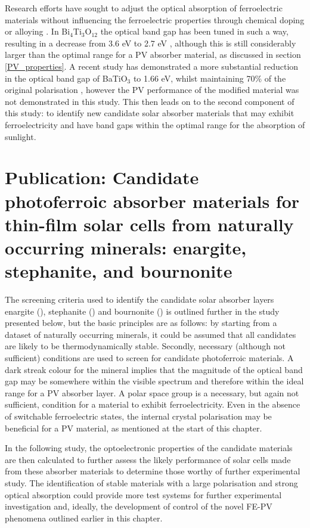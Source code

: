 \documentclass[11pt, twoside]{report}
\begin{document}
Research efforts have sought to adjust the optical absorption of ferroelectric materials without influencing the ferroelectric properties through chemical doping or alloying \cite{FE_PV_rev1}. In Bi$_4$Ti$_3$O$_{12}$ the optical band gap has been tuned in such a way, resulting in a decrease from 3.6 eV to 2.7 eV \cite{FE_PV_rev1_83}, although this is still considerably larger than the optimal range for a PV absorber material, as discussed in section \ref{PV_properties}. A recent study has demonstrated a more substantial reduction in the optical band gap of BaTiO$_3$  to 1.66 eV, whilst maintaining 70\% of the original polarisation \cite{FE-PV_lett}, however the PV performance of the modified material was not demonstrated in this study. 
This then leads on to the second component of this study: to identify new candidate solar absorber materials that may exhibit ferroelectricity and have band gaps within the optimal range for the absorption of sunlight. 

\section{Publication: Candidate photoferroic absorber materials for thin-film
solar cells from naturally occurring minerals:
enargite, stephanite, and bournonite}\label{sulfosalts1}


The screening criteria used to identify the candidate solar absorber layers enargite ({\enargite}), stephanite ({\stephanite}) and bournonite ({\bournonite}) is outlined further in the study presented below, but the basic principles are as follows: by starting from a dataset of naturally occurring minerals, it could be assumed that all candidates are likely to be thermodynamically stable. Secondly, necessary (although not sufficient) conditions are used to screen for candidate photoferroic materials. A dark streak colour for the mineral implies that the magnitude of the optical band gap may be somewhere within the visible spectrum and therefore within the ideal range for a PV absorber layer. A polar space group is a necessary, but again not sufficient, condition for a material to exhibit ferroelectricity. Even in the absence of switchable ferroelectric states, the internal crystal polarisation may be beneficial for a PV material, as mentioned at the start of this chapter.

In the following study, the optoelectronic properties of the candidate materials are then calculated to further assess the likely performance of solar cells made from these absorber materials to determine those worthy of further experimental study. The identification of stable materials with a large polarisation and strong optical absorption could provide more test systems for further experimental investigation and, ideally, the development of control of the novel FE-PV phenomena outlined earlier in this chapter.
\end{document}
